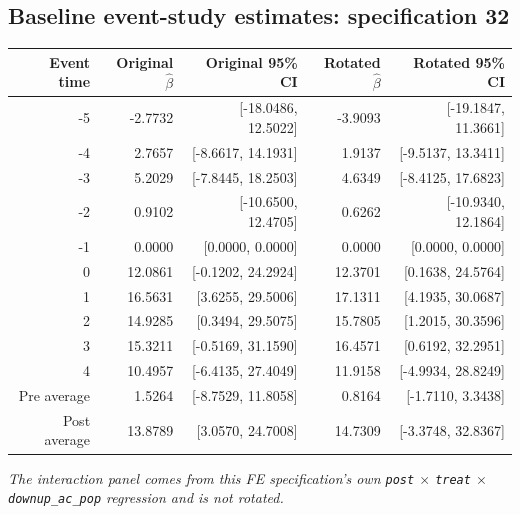 \documentclass[10pt]{article}
\begin{document}
\subsection*{Baseline event-study estimates: specification 32}
\begin{center}
\scriptsize
\begin{tabular}{r rr rr}
\toprule
Event time & Original $\hat\beta$ & Original 95\% CI & Rotated $\hat\beta$ & Rotated 95\% CI \\
\midrule
-5 & -2.7732 & [-18.0486, 12.5022] & -3.9093 & [-19.1847, 11.3661] \\
-4 & 2.7657 & [-8.6617, 14.1931] & 1.9137 & [-9.5137, 13.3411] \\
-3 & 5.2029 & [-7.8445, 18.2503] & 4.6349 & [-8.4125, 17.6823] \\
-2 & 0.9102 & [-10.6500, 12.4705] & 0.6262 & [-10.9340, 12.1864] \\
-1 & 0.0000 & [0.0000, 0.0000] & 0.0000 & [0.0000, 0.0000] \\
0 & 12.0861 & [-0.1202, 24.2924] & 12.3701 & [0.1638, 24.5764] \\
1 & 16.5631 & [3.6255, 29.5006] & 17.1311 & [4.1935, 30.0687] \\
2 & 14.9285 & [0.3494, 29.5075] & 15.7805 & [1.2015, 30.3596] \\
3 & 15.3211 & [-0.5169, 31.1590] & 16.4571 & [0.6192, 32.2951] \\
4 & 10.4957 & [-6.4135, 27.4049] & 11.9158 & [-4.9934, 28.8249] \\
\midrule
Pre average & 1.5264 & [-8.7529, 11.8058] & 0.8164 & [-1.7110, 3.3438] \\
Post average & 13.8789 & [3.0570, 24.7008] & 14.7309 & [-3.3748, 32.8367] \\
\bottomrule
\end{tabular}
\end{center}
\medskip
\textit{The interaction panel comes from this FE specification's own \texttt{post} $\times$ \texttt{treat} $\times$ \texttt{downup\_ac\_pop} regression and is not rotated.}
\clearpage
\end{document}
